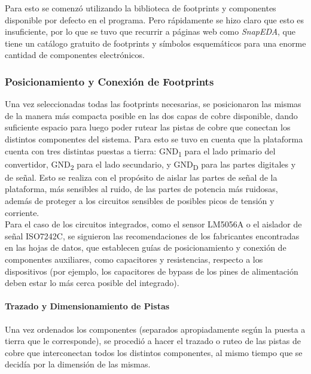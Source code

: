 Para esto se comenzó utilizando la biblioteca de footprints y componentes disponible por defecto en el programa. Pero rápidamente se hizo claro que esto es insuficiente, por lo que se tuvo que recurrir a páginas web como \textit{SnapEDA}, que tiene un catálogo gratuito de footprints y símbolos esquemáticos para una enorme cantidad de componentes electrónicos.\\

\subsubsection{Posicionamiento y Conexión de Footprints}
 
Una vez seleccionadas todas las footprints necesarias, se posicionaron las mismas de la manera más compacta posible en las dos capas de cobre disponible, dando suficiente espacio para luego poder rutear las pistas de cobre que conectan los distintos componentes del sistema. Para esto se tuvo en cuenta que la plataforma cuenta con tres distintas puestas a tierra: GND\textsubscript{1} para el lado primario del convertidor, GND\textsubscript{2} para el lado secundario, y GND\textsubscript{D} para las partes digitales y de señal. Esto se realiza con el propósito de aislar las partes de señal de la plataforma, más sensibles al ruido, de las partes de potencia más ruidosas, además de proteger a los circuitos sensibles de posibles picos de tensión y corriente.\\

Para el caso de los circuitos integrados, como el sensor LM5056A o el aislador de señal ISO7242C, se siguieron las recomendaciones de los fabricantes encontradas en las hojas de datos, que establecen guías de posicionamiento y conexión de componentes auxiliares, como capacitores y resistencias, respecto a los dispositivos (por ejemplo, los capacitores de bypass de los pines de alimentación deben estar lo más cerca posible del integrado).\\

\paragraph{Trazado y Dimensionamiento de Pistas}

Una vez ordenados los componentes (separados apropiadamente según la puesta a tierra que le corresponde), se procedió a hacer el trazado o ruteo de las pistas de cobre que interconectan todos los distintos componentes, al mismo tiempo que se decidía por la dimensión de las mismas.\\

